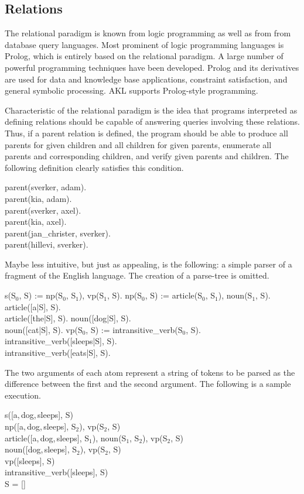 \subsection{Relations}

The relational paradigm is known from logic programming as well as
from from database query languages.  Most prominent of logic
programming languages is Prolog, which is entirely based on the
relational paradigm.  A large number of powerful programming
techniques have been developed.  Prolog and its derivatives are used
for data and knowledge base applications, constraint satisfaction, and
general symbolic processing.  AKL supports Prolog-style programming.

Characteristic of the relational paradigm is the idea that programs
interpreted as defining relations should be capable of answering
queries involving these relations.  Thus, if a parent relation is
defined, the program should be able to produce all parents for given
children and all children for given parents, enumerate all parents and
corresponding children, and verify given parents and children.  The
following definition clearly satisfies this condition.
%
\begin{program}
parent(sverker, adam).  \\
parent(kia, adam).  \\
parent(sverker, axel).  \\
parent(kia, axel).  \\
parent(jan_christer, sverker).  \\
parent(hillevi, sverker).
\end{program}%
%
Maybe less intuitive, but just as appealing, is the following: a
simple parser of a fragment of the English language.  The creation of
a parse-tree is omitted.
%
\begin{program}
s(S$_0$, S) := np(S$_0$, S$_1$), vp(S$_1$, S).  \nl
np(S$_0$, S) := article(S$_0$, S$_1$), noun(S$_1$, S).  \nl
article([a|S], S).  \\
article([the|S], S).  \nl
noun([dog|S], S).  \\
noun([cat|S], S).  \nl
vp(S$_0$, S) := intransitive_verb(S$_0$, S).  \nl
intransitive_verb([sleeps|S], S).  \\
intransitive_verb([eats|S], S).
\end{program}%
%
The two arguments of each atom represent a string of tokens to be
parsed as the difference between the first and the second
argument.  The following is a sample execution.
%
\begin{progex}
s([a,\,dog,\,sleeps], S) \\
np([a,\,dog,\,sleeps], S$_2$), vp(S$_2$, S) \\
article([a,\,dog,\,sleeps], S$_1$), noun(S$_1$, S$_2$), vp(S$_2$, S) \\
noun([dog,\,sleeps], S$_2$), vp(S$_2$, S) \\
vp([sleeps], S) \\
intransitive_verb([sleeps], S) \\
S = []
\end{progex}%
